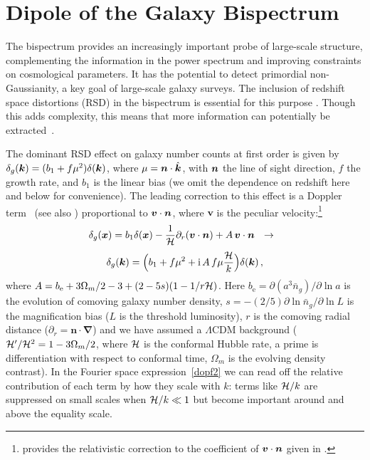 \chapter{Dipole of the Galaxy Bispectrum}
\label{chapter:dipole}

The bispectrum provides an increasingly important probe of large-scale structure, complementing the information in the power spectrum and improving constraints on cosmological parameters. It has the potential to detect primordial non-Gaussianity, a key goal of large-scale galaxy surveys. The inclusion of redshift space distortions (RSD) in the bispectrum is essential for this purpose
\citep{Verde:1998zr,Scoccimarro:1999ed}. Though this adds complexity, this means that more information can potentially be extracted~\citep{Tellarini:2016sgp}.

The dominant RSD effect on galaxy number counts at first order is given by $\delta_g(\bm {k}) = (b_{1} + f\mu^{2})\delta(\bm {k})$, where $\mu=\bm {n}\cdot\hat{\bm {k}}$, with $\bm {n}$ the line of sight direction, $f$ the growth rate, and $b_1$ is the linear bias (we omit the dependence on redshift here and below for convenience). The leading correction to this effect is a Doppler term~\citep{Kaiser:1987qv,McDonald:2009dh,Challinor:2011bk} (see also \citet{Raccanelli:2016avd,Hall:2016bmm,Abramo:2017xnp})
proportional to $\bm{v}\cdot\bm {n}$, where $\bm{v}$ is the peculiar velocity:\footnote{\citet{Challinor:2011bk} provides the relativistic correction to the coefficient of  $\bm{v}\cdot\bm {n}$ given in \citet{Kaiser:1987qv,McDonald:2009dh}.}
\begin{equation} \label{dopf}
\delta_g(\bm {x}) = b_{1} \delta(\bm {x})-{\frac{1}{\mathcal{H}}}\partial_r(\bm{v}\cdot\bm {n}) +{A}\,\bm{v}\cdot\bm {n} ~~\to~~
\end{equation}
\begin{equation} \delta_g(\bm {k})=\Big(b_1+f\mu^2+\mathrm{i\,} {A}\,f \mu{\frac{\mathcal{H}}{k}}\Big)\delta(\bm {k})\,,\label{dopf2}
\end{equation}
where  ${A} = {b_{\textrm{e}}+{3}\Omega_m/2 -3 + (2-5s) (1-{1/ r\mathcal{H}} )}$.
Here  $b_{\textrm{e}}=\partial (a^3 \bar{n}_g)/\partial \ln a$ is the evolution of comoving galaxy number density, $s=-(2/5)\partial \ln \bar{n}_g/\partial \ln L$ is the magnification bias ($L$ is the threshold luminosity), $r$ is the comoving radial distance ($\partial_r=\bm n\cdot\bm\nabla$) and we have assumed a $\Lambda$CDM background
($\mathcal{H}'/\mathcal{H}^2=1-3\Omega_m/2$, where $\mathcal{H}$ is the conformal Hubble rate, a prime is differentiation with respect to conformal time, $\Omega_m$ is the evolving density contrast). In the  Fourier space expression~\eqref{dopf2} we can read off the relative contribution of each term by how they scale with $k$: terms like $\mathcal{H}/k$ are suppressed on small scales when $\mathcal{H}/k\ll1$ but become important around and above the equality scale. 



